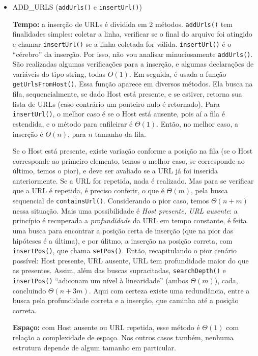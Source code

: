 \documentclass{article}
\def\code#1{\texttt{#1}}
\begin{document}
\begin{itemize}

    \item ADD\_URLS (\code{addUrls()} e \code{insertUrl()})

        \textbf{Tempo:} a inserção de URLs é dividida em 2 métodos. \code{addUrls()} tem finalidades simples: coletar a linha, verificar se o final do arquivo foi atingido e chamar \code{insertUrl()} se a linha coletada for válida. \code{insertUrl()} é o ``cérebro'' da inserção. Por isso, não vou analisar minuciosamente \code{addUrls()}. São realizadas algumas verificações para a inserção, e algumas declarações de variáveis do tipo string, todas \( O(1) \). Em seguida, é usada a função \code{getUrlsFromHost()}. Essa função aparece em diversos métodos. Ela busca na fila, sequencialmente, se dado Host está presente, e se estiver, retorna sua lista de URLs (caso contrário um ponteiro nulo é retornado). Para \code{insertUrl()}, o melhor caso é se o Host está ausente, pois aí a fila é estendida, e o método para enfileirar é \( \Theta(1) \). Então, no melhor caso, a inserção é \( \Theta(n) \), para \( n \) tamanho da fila. 

        Se o Host está presente, existe variação conforme a posição na fila (se o Host corresponde ao primeiro elemento, temos o melhor caso, se corresponde ao último, temos o pior), e deve ser avaliado se a URL já foi inserida anteriormente. Se a URL for repetida, nada é realizado. Mas para se verificar que a URL é repetida, é preciso conferir, o que é \( \Theta(m) \), pela busca sequencial de \code{containsUrl()}. Considerando o pior caso, temos \( \Theta(n+m) \) nessa situação. Mais uma possibilidade é \textit{Host presente, URL ausente}: a princípio é recuperada a \textit{profundidade} da URL em tempo constante, é feita uma busca para encontrar a posição certa de inserção (que na pior das hipóteses é a última), e por úlitmo, a inserção na posição correta, com \code{insertPos()}, que chama \code{setPos()}. Então, recapitulando o pior cenário possível: Host presente, URL ausente, URL tem profundidade maior do que as presentes. Assim, além das buscas supracitadas, \code{searchDepth()} e \code{insertPos()} ``adiconam um nível à linearidade'' (ambos \( \Theta(m) \)), cada, concluindo \( \Theta(n +3m) \). Aqui com certeza existe uma redundância, entre a busca pela profundidade correta e a inserção, que caminha até a posição correta.

        \textbf{Espaço:} com Host ausente ou URL repetida, esse método é \( \Theta(1) \) com relação a complexidade de espaço. Nos outros casos também, nenhuma estrutura depende de algum tamanho em particular.


\end{itemize}
\end{document}
